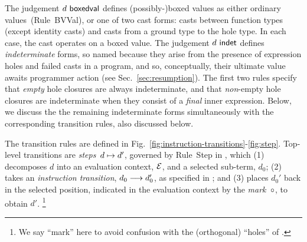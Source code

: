 


The judgement $d~\mathsf{boxedval}$ defines (possibly-)boxed values as
either ordinary values~(Rule~{BVVal}), or one of two cast forms: casts
between function types (except identity casts) and casts from a ground
type to the hole type. In each case, the cast operates on a boxed
value.
%
%
The judgement $d~\mathsf{indet}$ defines \emph{indeterminate} forms, so
named because they arise from the presence of expression holes and
failed casts in a program, and so, conceptually, their ultimate value
awaits programmer action (see Sec.~\ref{sec:resumption}).
%
The first two rules specify that \emph{empty} hole closures are always
indeterminate, and that \emph{non}-empty hole closures are indeterminate when
they consist of a \emph{final} inner expression.
%
Below, we discuss the the remaining indeterminate forms simultaneously
with the corresponding transition rules, also discussed
below.



The transition rules are defined in Fig.~\ref{fig:instruction-transitions}-\ref{fig:step}.
%
Top-level transitions are \emph{steps}~$d \mapsto d'$, governed by Rule~{Step} in , which
%
(1) decomposes $d$ into an evaluation context, $\mathcal{E}$, and a selected sub-term, $d_0$;
%
(2) takes an \emph{instruction transition}, $d_0 \longrightarrow d_0'$, as specified in ;
%
and (3) places $d_0'$ back in the selected position, indicated in
the evaluation context by the \emph{mark}~$\circ$, to obtain $d'$.%
\footnote{
        We say ``mark'' here to avoid confusion with the (orthogonal) ``holes'' of \HazelnutLive.
        }
%


